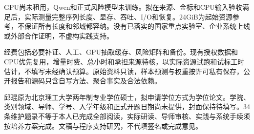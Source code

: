 GPU尚未租用，Qwen和正式风险模型未训练。拟在来源、金标和CPU输入验收满足后，实际测量完整序列长度、显存、吞吐、I/O和恢复。24GiB为起始资源参考，不保证所有长度和邻域都容纳。没有已落实的国家重点实验室、企业系统上线或外部合作证明，不虚构实践支持。

经费包括必要补证、人工、GPU抽取缓存、风险矩阵和备份。现有授权数据和CPU优先复用，增量时费、总小时和承担来源待核，以实际资源试跑和试标工时估计，不填写未经确认预算。原始资料只读，样本预测与权重按许可私有保存，公开报告和源码只含自写方法、聚合事实及合法依赖。

邱琨原为北京理工大学两年制专业学位硕士，拟申请学位方式为学位论文。学院、类别领域、导师、学号、入学年级和正式开题日期尚未提供，封面保持待填写。34条维护题录不等于本人已完成全部阅读，实际研读、导师审核、实践与系统手续须按培养方案完成。文稿与程序支持研究，不代填签名或完成意见。
